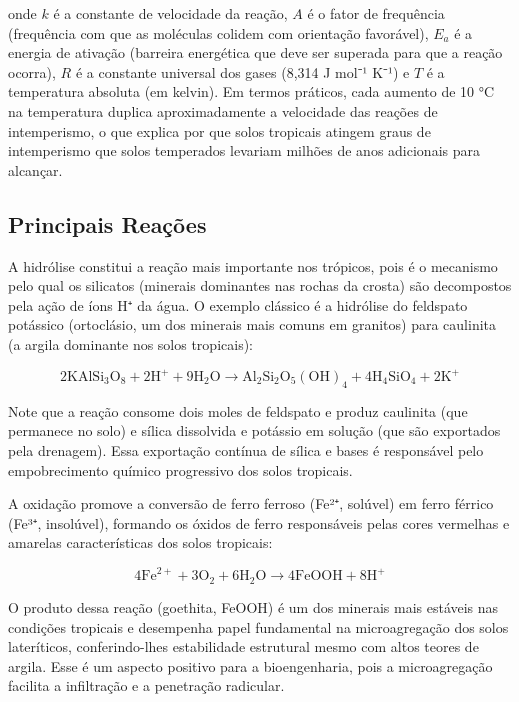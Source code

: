 \documentclass[
  portuguese,
  11pt,
  a4paper,
  open=any]{scrbook}
\begin{document}
onde \(k\) é a constante de velocidade da reação, \(A\) é o fator de
frequência (frequência com que as moléculas colidem com orientação
favorável), \(E_a\) é a energia de ativação (barreira energética que
deve ser superada para que a reação ocorra), \(R\) é a constante
universal dos gases (8,314 J mol⁻¹ K⁻¹) e \(T\) é a temperatura absoluta
(em kelvin). Em termos práticos, cada aumento de 10 °C na temperatura
duplica aproximadamente a velocidade das reações de intemperismo, o que
explica por que solos tropicais atingem graus de intemperismo que solos
temperados levariam milhões de anos adicionais para alcançar.

\subsection{Principais Reações}\label{principais-reauxe7uxf5es}

A hidrólise constitui a reação mais importante nos trópicos, pois é o
mecanismo pelo qual os silicatos (minerais dominantes nas rochas da
crosta) são decompostos pela ação de íons H⁺ da água. O exemplo clássico
é a hidrólise do feldspato potássico (ortoclásio, um dos minerais mais
comuns em granitos) para caulinita (a argila dominante nos solos
tropicais):

\[
2 \text{KAlSi}_3\text{O}_8 + 2\text{H}^+ + 9\text{H}_2\text{O} \rightarrow \text{Al}_2\text{Si}_2\text{O}_5(\text{OH})_4 + 4\text{H}_4\text{SiO}_4 + 2\text{K}^+
\]

Note que a reação consome dois moles de feldspato e produz caulinita
(que permanece no solo) e sílica dissolvida e potássio em solução (que
são exportados pela drenagem). Essa exportação contínua de sílica e
bases é responsável pelo empobrecimento químico progressivo dos solos
tropicais.

A oxidação promove a conversão de ferro ferroso (Fe²⁺, solúvel) em ferro
férrico (Fe³⁺, insolúvel), formando os óxidos de ferro responsáveis
pelas cores vermelhas e amarelas características dos solos tropicais:

\[
4\text{Fe}^{2+} + 3\text{O}_2 + 6\text{H}_2\text{O} \rightarrow 4\text{FeOOH} + 8\text{H}^+
\]

O produto dessa reação (goethita, FeOOH) é um dos minerais mais estáveis
nas condições tropicais e desempenha papel fundamental na microagregação
dos solos lateríticos, conferindo-lhes estabilidade estrutural mesmo com
altos teores de argila. Esse é um aspecto positivo para a bioengenharia,
pois a microagregação facilita a infiltração e a penetração radicular.
\end{document}
